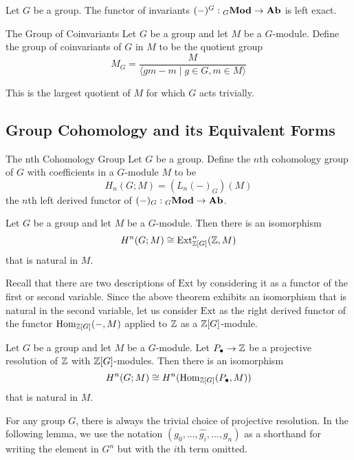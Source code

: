 \documentclass[a4paper]{article}
\begin{document}
\begin{thm}{}{} Let $G$ be a group. The functor of invariants $(-)^G:{_G}\bold{Mod}\to\bold{Ab}$ is left exact. 
\end{thm}

\begin{defn}{The Group of Coinvariants}{} Let $G$ be a group and let $M$ be a $G$-module. Define the group of coinvariants of $G$ in $M$ to be the quotient group $$M_G=\frac{M}{\langle gm-m\;|\;g\in G, m\in M\rangle}$$
\end{defn}

This is the largest quotient of $M$ for which $G$ acts trivially. 

\subsection{Group Cohomology and its Equivalent Forms}
\begin{defn}{The nth Cohomology Group}{} Let $G$ be a group. Define the $n$th cohomology group of $G$ with coefficients in a $G$-module $M$ to be $$H_n(G;M)=(L_n(-)_G)(M)$$ the $n$th left derived functor of $(-)_G:{_G\bold{Mod}}\to\bold{Ab}$. 
\end{defn}

\begin{thm}{}{} Let $G$ be a group and let $M$ be a $G$-module. Then there is an isomorphism $$H^n(G;M)\cong\text{Ext}^n_{\mathbb{Z}[G]}(\mathbb{Z},M)$$ that is natural in $M$. 
\end{thm}

Recall that there are two descriptions of $\text{Ext}$ by considering it as a functor of the first or second variable. Since the above theorem exhibits an isomorphism that is natural in the second variable, let us consider $\text{Ext}$ as the right derived functor of the functor $\operatorname{Hom}_{\mathbb{Z}[G]}(-,M)$ applied to $\mathbb{Z}$ as a $\mathbb{Z}[G]$-module. 

\begin{prp}{}{} Let $G$ be a group and let $M$ be a $G$-module. Let $P_\bullet\to\mathbb{Z}$ be a projective resolution of $\mathbb{Z}$ with $\mathbb{Z}[G]$-modules. Then there is an isomorphism $$H^n(G;M)\cong H^n(\operatorname{Hom}_{\mathbb{Z}[G]}(P_\bullet,M))$$ that is natural in $M$. 
\end{prp}

For any group $G$, there is always the trivial choice of projective resolution. 
In the following lemma, we use the notation $(g_0,\dots,\hat{g_i},\dots,g_n)$ as a shorthand for writing the element in $G^n$ but with the $i$th term omitted. 
\end{document}
